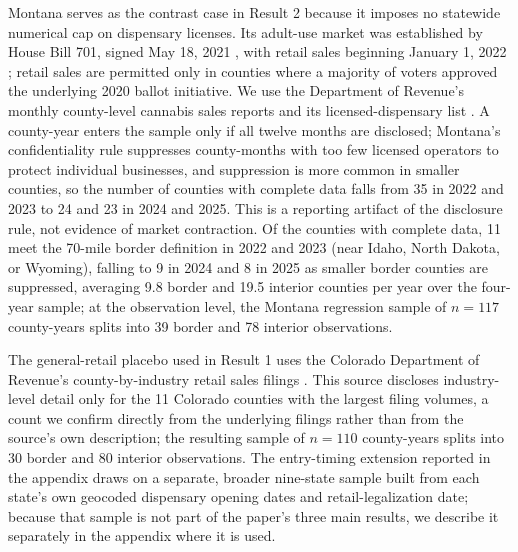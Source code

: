 \documentclass[12pt]{article}
\begin{document}
Montana serves as the contrast case in Result 2 because it imposes no statewide numerical cap on dispensary
licenses. Its adult-use market was established by House Bill 701, signed May 18, 2021 \citep{MTHB701}, with
retail sales beginning January 1, 2022 \citep{MTRevenueCannabis}; retail sales are permitted only in counties
where a majority of voters approved the underlying 2020 ballot initiative. We use the Department of Revenue's
monthly county-level cannabis sales reports \citep{MTRevenueCountySales} and its licensed-dispensary list
\citep{MTDispensaryLocations}. A county-year enters the sample only if all twelve months are disclosed;
Montana's confidentiality rule suppresses county-months with too few licensed operators to protect individual
businesses, and suppression is more common in smaller counties, so the number of counties with complete data
falls from 35 in 2022 and 2023 to 24 and 23 in 2024 and 2025. This is a reporting artifact of the disclosure
rule, not evidence of market contraction. Of the counties with complete data, 11 meet the 70-mile border
definition in 2022 and 2023 (near Idaho, North Dakota, or Wyoming), falling to 9 in 2024 and 8 in 2025 as
smaller border counties are suppressed, averaging 9.8 border and 19.5 interior counties per year over the
four-year sample; at the observation level, the Montana regression sample of $n=117$ county-years splits
into 39 border and 78 interior observations.

The general-retail placebo used in Result 1 uses the Colorado Department of Revenue's county-by-industry
retail sales filings \citep{CDORRetailByCounty}. This source discloses industry-level detail only for the 11
Colorado counties with the largest filing volumes, a count we confirm directly from the underlying filings
rather than from the source's own description; the resulting sample of $n=110$ county-years splits into 30
border and 80 interior observations. The entry-timing extension reported in the appendix draws on a separate,
broader nine-state sample built from each state's own geocoded dispensary opening dates and
retail-legalization date; because that sample is not part of the paper's three main results, we describe it
separately in the appendix where it is used.
\end{document}
